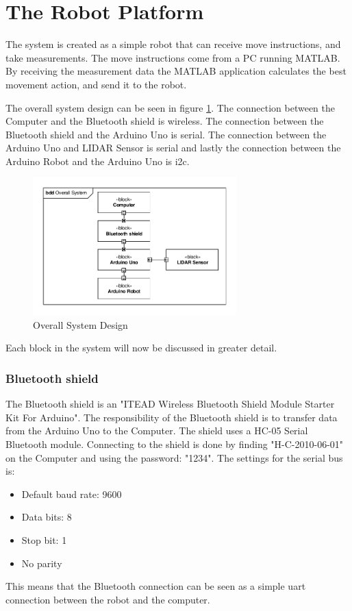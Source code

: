 \section{The Robot Platform}
The system is created as a simple robot that can receive move instructions, and take measurements. The move instructions come from a PC running MATLAB. By receiving the measurement data the MATLAB application calculates the best movement action, and send it to the robot. 

The overall system design can be seen in figure \ref{fig:OSD}. The connection between the Computer and the Bluetooth shield is wireless. The connection between the Bluetooth shield and the Arduino Uno is serial. The connection between the Arduino Uno and LIDAR Sensor is serial and lastly the connection between the Arduino Robot and the Arduino Uno is i2c.
\begin{figure}[H]
\centering
\includegraphics[width=0.7\textwidth]{billeder/OverallSystemDesign}
\caption{Overall System Design}
\label{fig:OSD}
\end{figure}
Each block in the system will now be discussed in greater detail. 

\subsubsection{Bluetooth shield}
The Bluetooth shield is an "ITEAD Wireless Bluetooth Shield Module Starter Kit For Arduino"\cite{BTshield}\cite{BTshield2}. The responsibility of the Bluetooth shield is to transfer data from the Arduino Uno to the Computer. The shield uses a HC-05 Serial Bluetooth module. Connecting to the shield is done by finding "H-C-2010-06-01" on the Computer and using the password: "1234". The settings for the serial bus is:
\begin{itemize}
\item Default baud rate: 9600
\item Data bits: 8
\item Stop bit: 1
\item No parity
\end{itemize}
This means that the Bluetooth connection can be seen as a simple uart connection between the robot and the computer. 

